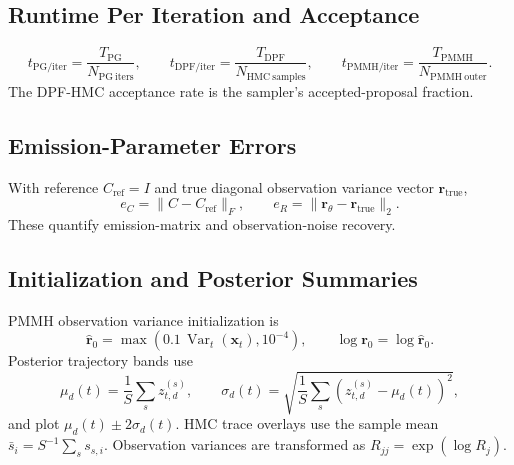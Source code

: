 \documentclass[11pt]{article}
\begin{document}
\subsection*{Runtime Per Iteration and Acceptance}
\[
t_{\mathrm{PG/iter}}=\frac{T_{\mathrm{PG}}}{N_{\mathrm{PG\ iters}}},
\qquad
t_{\mathrm{DPF/iter}}=\frac{T_{\mathrm{DPF}}}{N_{\mathrm{HMC\ samples}}},
\qquad
t_{\mathrm{PMMH/iter}}=\frac{T_{\mathrm{PMMH}}}{N_{\mathrm{PMMH\ outer}}}.
\]
The DPF-HMC acceptance rate is the sampler's accepted-proposal fraction.

\subsection*{Emission-Parameter Errors}
With reference \(C_{\mathrm{ref}}=I\) and true diagonal observation variance vector \(\bm r_{\mathrm{true}}\),
\[
e_C=\|C-C_{\mathrm{ref}}\|_F,\qquad
e_R=\|\bm r_\theta-\bm r_{\mathrm{true}}\|_2.
\]
These quantify emission-matrix and observation-noise recovery.

\subsection*{Initialization and Posterior Summaries}
PMMH observation variance initialization is
\[
\hat{\bm r}_0=\max(0.1\,\operatorname{Var}_t(\bm x_t),10^{-4}),\qquad
\log\bm r_0=\log\hat{\bm r}_0.
\]
Posterior trajectory bands use
\[
\mu_d(t)=\frac{1}{S}\sum_s z^{(s)}_{t,d},\qquad
\sigma_d(t)=\sqrt{\frac{1}{S}\sum_s(z^{(s)}_{t,d}-\mu_d(t))^2},
\]
and plot \(\mu_d(t)\pm2\sigma_d(t)\). HMC trace overlays use the sample mean \(\bar s_i=S^{-1}\sum_s s_{s,i}\). Observation variances are transformed as \(R_{jj}=\exp(\log R_j)\).
\end{document}
